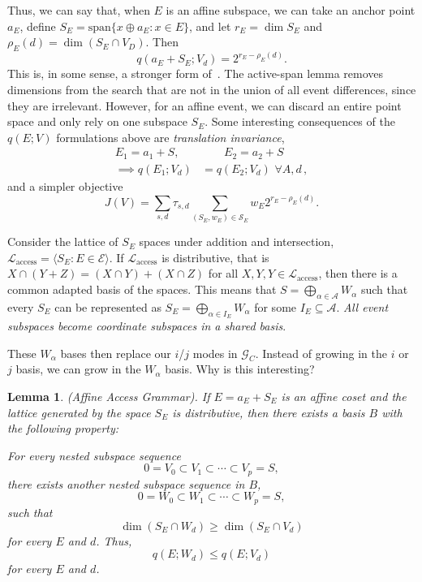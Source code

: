 \documentclass[10pt]{article}
\newtheorem{lemma}{Lemma}
\theoremstyle{remark}
\begin{document}
Thus, we can say that, when $E$ is an affine subspace, we can take an anchor point $a_E$, define $S_E = \text{span}\{x \oplus a_E : x \in E\}$, and let $r_E = \dim S_E$ and $\rho_E(d) = \dim (S_E \cap V_D)$. Then
%
\[
    q(a_E + S_E; V_d) = 2^{r_E - \rho_E(d)}.
\]
%
This is, in some sense, a stronger form of~. The active-span lemma removes dimensions from the search that are not in the union of all event differences, since they are irrelevant. However, for an affine event, we can discard an entire point space and only rely on one subspace $S_E$. Some interesting consequences of the $q(E;V)$ formulations above are {\it translation invariance},
%
\[
    \begin{aligned}
        E_1 = a_1 + S, &\quad\quad E_2 = a_2 + S \\
        \implies q(E_1; V_d) &= q(E_2; V_d)\,\, \forall A,d\, ,
    \end{aligned}
\]
%
and a simpler objective
%
\[
    J(V) = \sum_{s,d} \tau_{s,d} \sum_{(S_E,w_E)\in \mathcal{S}_E} w_E 2^{r_E - \rho_E(d)} .
\]

Consider the lattice of $S_E$ spaces under addition and intersection, $\mathcal{L}_{\text{access}} = \langle S_E : E \in \mathcal{E} \rangle$. If $\mathcal{L}_{\text{access}}$ is distributive, that is $X\cap (Y+Z) = (X\cap Y) + (X\cap Z)$ for all $X,Y,Y \in \mathcal{L}_{\text{access}}$, then there is a common adapted basis of the spaces. This means that $S = \bigoplus_{\alpha\in\mathcal{A}} W_\alpha$ such that every $S_E$ can be represented as $S_E = \bigoplus_{\alpha \in I_E} W_\alpha$ for some $I_E\subseteq \mathcal{A}$. \emph{All event subspaces become coordinate subspaces in a shared basis}.

These $W_\alpha$ bases then replace our $i$/$j$ modes in $\mathcal{G}_C$. Instead of growing in the $i$ or $j$ basis, we can grow in the $W_\alpha$ basis. Why is this interesting?

\begin{lemma}{(Affine Access Grammar).}
    If $E=a_E + S_E$ is an affine coset and the lattice generated by the space $S_E$ is distributive, then there exists a basis $B$ with the following property:

    For every nested subspace sequence
    \[
        0 = V_0 \subset V_1 \subset \cdots \subset V_p = S,
    \]
    there exists another nested subspace sequence in $B$,
    \[
        0 = W_0 \subset W_1 \subset \cdots \subset W_p = S,
    \]
    such that 
    \[
        \dim\left(S_E\cap W_d\right) \ge \dim\left(S_E\cap V_d\right)
    \]
    for every $E$ and $d$. Thus,
    \[
        q(E; W_d) \le q(E; V_d)
    \]
    for every $E$ and $d$.
\end{lemma}
\end{document}
